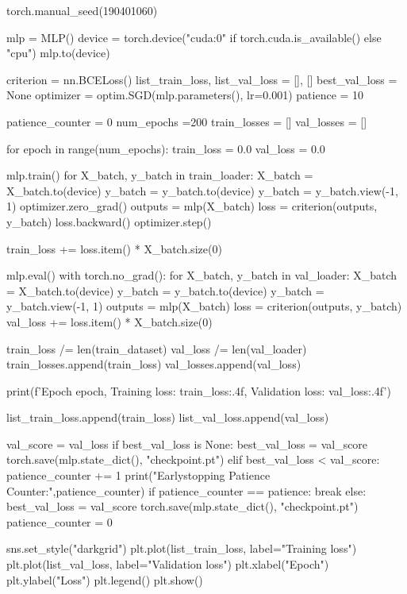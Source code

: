 \documentclass[11pt]{article}
\begin{document}
\begin{python}
torch.manual_seed(190401060)

mlp = MLP()
device = torch.device("cuda:0" if torch.cuda.is_available() else "cpu")
mlp.to(device)

criterion = nn.BCELoss()
list_train_loss, list_val_loss = [], []
best_val_loss = None
optimizer = optim.SGD(mlp.parameters(), lr=0.001)
patience = 10

patience_counter = 0
num_epochs =200
train_losses = []
val_losses = []

for epoch in range(num_epochs):
    train_loss = 0.0
    val_loss = 0.0

    mlp.train()
    for X_batch, y_batch in train_loader:
        X_batch = X_batch.to(device)
        y_batch = y_batch.to(device)
        y_batch = y_batch.view(-1, 1)
        optimizer.zero_grad()
        outputs = mlp(X_batch)
        loss = criterion(outputs, y_batch)
        loss.backward()
        optimizer.step()

        train_loss += loss.item() * X_batch.size(0)

    mlp.eval()
    with torch.no_grad():
        for X_batch, y_batch in val_loader:
            X_batch = X_batch.to(device)
            y_batch = y_batch.to(device)
            y_batch = y_batch.view(-1, 1)
            outputs = mlp(X_batch)
            loss = criterion(outputs, y_batch)
            val_loss += loss.item() * X_batch.size(0)

    train_loss /= len(train_dataset)
    val_loss /= len(val_loader)
    train_losses.append(train_loss)
    val_losses.append(val_loss)

    print(f'Epoch {epoch}, Training loss: {train_loss:.4f}, Validation loss: {val_loss:.4f}')

    list_train_loss.append(train_loss)
    list_val_loss.append(val_loss)

    val_score = val_loss
    if best_val_loss is None:
        best_val_loss = val_score 
        torch.save(mlp.state_dict(), "checkpoint.pt")
    elif best_val_loss < val_score: 
        patience_counter += 1
        print("Earlystopping Patience Counter:",patience_counter)
        if patience_counter == patience:
            break
    else:
        best_val_loss = val_score
        torch.save(mlp.state_dict(), "checkpoint.pt") 
        patience_counter = 0

sns.set_style("darkgrid")
plt.plot(list_train_loss, label="Training loss")
plt.plot(list_val_loss, label="Validation loss")
plt.xlabel("Epoch")
plt.ylabel("Loss")
plt.legend()
plt.show()
\end{python}
\end{document}
